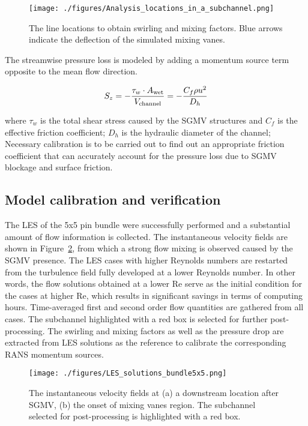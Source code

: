 \begin{figure}[!ht]
\centering
\texttt{[image: ./figures/Analysis\_locations\_in\_a\_subchannel.png]}
\caption{The line locations to obtain swirling and mixing factors. Blue arrows indicate the deflection of the simulated mixing vanes.}
\label{fig:sblines}
\end{figure}

The streamwise pressure loss is modeled by adding a momentum source term opposite to the mean flow direction.

\begin{equation}
  S_z = -\frac{\tau_w \cdot A_\text{wet}}{V_\text{channel}}=-\frac{C_f \rho u^2}{D_h}\\
\end{equation}

where $\tau_w$ is the total shear stress caused by the SGMV structures and
$C_f$ is the effective friction coefficient;
$D_h$ is the hydraulic diameter of the channel;
Necessary calibration is to be carried out to find out an appropriate friction coefficient that can accurately account for the pressure loss due to SGMV blockage and surface friction.


\subsection{Model calibration and verification}
\label{sec:msm2}

The LES of the 5x5 pin bundle were successfully performed and a substantial amount of flow information is collected.
The instantaneous velocity fields are shown in Figure~\ref{fig:velles}, from which a strong flow mixing is observed caused by the SGMV presence.
The LES cases with higher Reynolds numbers are restarted from the turbulence field fully developed at a lower Reynolds number.
In other words, the flow solutions obtained at a lower Re serve as the initial condition for the cases at higher Re, which results in significant savings in terms of computing hours.
Time-averaged first and second order flow quantities are gathered from all cases.
The subchannel highlighted with a red box is selected for further post-processing.
The swirling and mixing factors as well as the pressure drop are extracted from LES  solutions as the reference to calibrate the corresponding RANS momentum sources.

\begin{figure}[!ht]
\centering
\texttt{[image: ./figures/LES\_solutions\_bundle5x5.png]}
\caption{The instantaneous velocity fields at (a) a downstream location after SGMV, (b) the onset of mixing vanes region. The subchannel selected for post-processing is highlighted with a red box.}
\label{fig:velles}
\end{figure}

